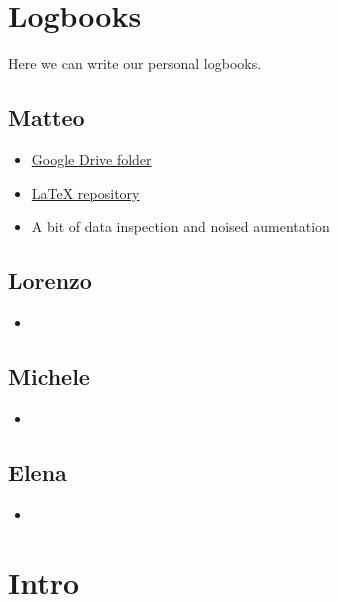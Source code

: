 \documentclass[11pt]{article}
\begin{document}
\begin{multicols*}{2}
        \newpage

        \section{Logbooks}

        Here we can write our personal logbooks.

        \subsection{Matteo}

        \begin{itemize}
            \item \href{https://drive.google.com/drive/folders/1XqCxOkXIFV81NU8IlltS38bM65k9N-bR?usp=sharing}{Google Drive folder}
            \item \href{https://github.com/BonfaTex/DeepL-1}{\LaTeX{} repository}
            \item A bit of data inspection and noised aumentation
        \end{itemize}

        \subsection{Lorenzo}

        \begin{itemize}
            \item 
        \end{itemize}

        \subsection{Michele}

        \begin{itemize}
            \item 
        \end{itemize}

        \subsection{Elena}

        \begin{itemize}
            \item 
        \end{itemize}

        \newpage

        \section{Intro}
    

\end{multicols*}
\end{document}
